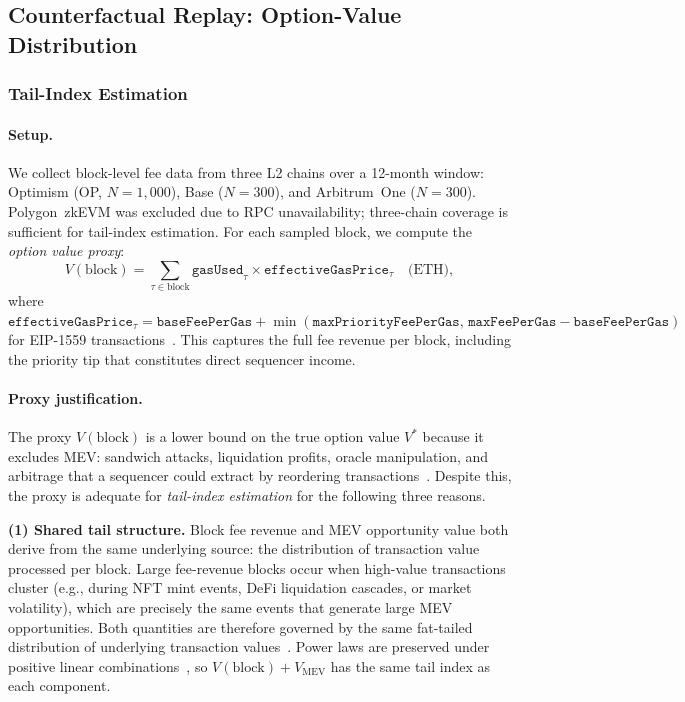 \subsection{Counterfactual Replay: Option-Value Distribution}
\label{sec:meas-replay}

\subsubsection{Tail-Index Estimation}
\label{sec:meas-tailindex}

\paragraph{Setup.}
We collect block-level fee data from three L2 chains over a 12-month window:
Optimism (OP, $N=1{,}000$), Base ($N=300$), and Arbitrum~One ($N=300$).
Polygon~zkEVM was excluded due to RPC unavailability; three-chain coverage
is sufficient for tail-index estimation. For each sampled block,
we compute the \emph{option value proxy}:
\[
  V(\text{block}) = \sum_{\tau \in \text{block}}
    \texttt{gasUsed}_\tau \times \texttt{effectiveGasPrice}_\tau \quad \text{(ETH)},
\]
where $\texttt{effectiveGasPrice}_\tau = \texttt{baseFeePerGas} +
\min(\texttt{maxPriorityFeePerGas},\, \texttt{maxFeePerGas} - \texttt{baseFeePerGas})$
for EIP-1559 transactions~\cite{eip1559}. This captures the full fee revenue
per block, including the priority tip that constitutes direct sequencer income.

\paragraph{Proxy justification.}
The proxy $V(\text{block})$ is a lower bound on the true option value $V^*$
because it excludes MEV: sandwich attacks, liquidation profits, oracle
manipulation, and arbitrage that a sequencer could extract by reordering
transactions~\cite{daian2020flash, obadia2021unity}. Despite this, the proxy
is adequate for \emph{tail-index estimation} for the following three reasons.

\textbf{(1) Shared tail structure.}
Block fee revenue and MEV opportunity value both derive from the same underlying
source: the distribution of transaction value processed per block. Large fee-revenue
blocks occur when high-value transactions cluster (e.g., during NFT mint events,
DeFi liquidation cascades, or market volatility), which are precisely the same
events that generate large MEV opportunities. Both quantities are therefore
governed by the same fat-tailed distribution of underlying transaction
values~\cite{Gabaix2009}. Power laws are preserved under positive linear
combinations~\cite{EmbrechtsKM1997}, so $V(\text{block}) + V_{\text{MEV}}$
has the same tail index as each component.

